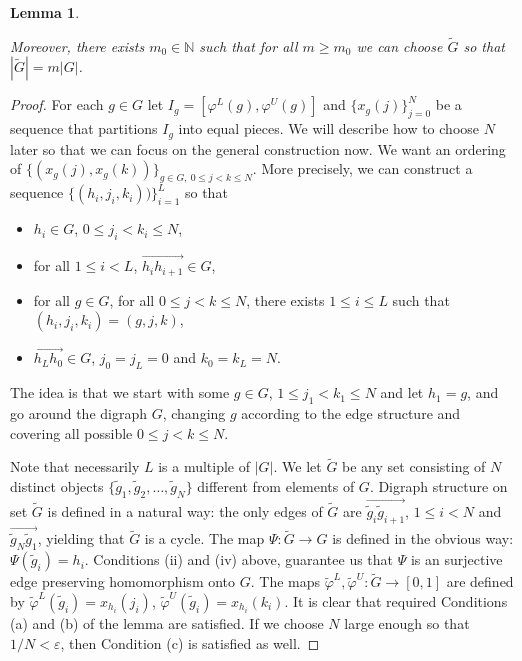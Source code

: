 \documentclass[11pt]{amsart}
\newtheorem{lemma}[theorem]{Lemma}
\newcommand{\N}{\mathbb{N}}  %
\newcommand{\oa}{\overrightarrow}
\begin{document}
{\begin{lemma}
\begin{enumerate}[label=(\alph*)]
      \end{enumerate}
      Moreover, there exists $m_0 \in \N$ such that for all $m \ge m_0$ we can choose $\tilde G$ so that  $|\tilde G|=m|G|$.
\end{lemma}

\begin{proof}
    For each $g \in G$ let $I_g =[\varphi^L(g),\varphi^U(g)]$ and $\{x_g(j)\}_{j=0}^N$ be a sequence that partitions $I_g$ into equal pieces. We will describe how to choose $N$ later so that we can focus on the general construction now.  We want an ordering of $\{(x_g(j),x_g(k))\}_{g \in G,\  0 \le j < k \le N} $. More precisely, we can construct a sequence $\{(h_i, j_i,k_i))\}_{i=1}^L$ so that
    \begin{itemize}
        \item [(i)] $h_i \in G$, $0 \le j_i < k_i 
        \le N$,
        \item[(ii)] for all $1 \le i <L$, $\oa{h_ih_{i+1}} \in G$,
        \item[(iii)] for all $g \in G$, for all $0 \le j <k \le N$, there exists $1 \le i \le L$ such that $(h_{i},j_{i},k_{i}) = (g, j, k)$,
         \item[(iv)] $\oa{h_Lh_0} \in G$, $j_0=j_L=0$ and $k_0= k_L=N$.
        
    \end{itemize}
    The idea is that we start with some $g \in G$, $1 \le j_1 < k_1 \le  N$ and let $h_1 =g$, and go around the digraph $G$, changing $g$ according to the edge structure and covering all possible $0 \le j <k \leq N$.

    Note that necessarily $L$ is a multiple of $|G|$. 
    We let $\tilde{G}$ be any set consisting of $N$ distinct objects $\{\tilde{g}_1, \tilde{g}_2, \ldots, \tilde{g}_N\}$ different from elements of $G$. Digraph structure on set $\tilde{G}$ is defined in a natural way: the only edges of $\tilde{G}$ are $\oa{\tilde{g}_i\tilde{g}_{i+1}}$,  $1 \le i <N$ and $\oa{\tilde{g}_N \tilde{g}_1}$, yielding that $\tilde{G}$ is a cycle. The map $\Psi: \tilde{G} \rightarrow G$ is defined in the obvious way: $\Psi(\tilde{g}_i) = h_i$. Conditions (ii) and (iv) above, guarantee us that $\Psi$ is an surjective edge preserving homomorphism onto $G$. The maps $\tilde{\varphi}^L, \tilde{\varphi}^U: \tilde{G} \rightarrow [0,1]$ are defined by $\tilde{\varphi}^L (\tilde{g}_i)=x_{h_i}(j_i)$, $\tilde{\varphi}^U (\tilde{g}_i)=x_{h_i}(k_i)$. It is clear that required Conditions (a) and (b) of the lemma  are satisfied. If we choose $N$ large enough so that $1/N < \varepsilon$, then Condition (c) is satisfied as well.


\end{proof}}
\end{document}
